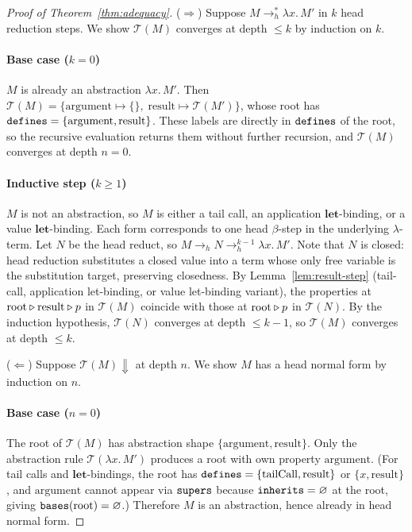 \begin{proof}[Proof of Theorem~\ref{thm:adequacy}]
  ($\Rightarrow$)
  Suppose $M \to^*_h \lambda x.\, M'$ in $k$ head reduction
  steps.
  We show $\mathcal{T}(M)$ converges at depth $\le k$ by
  induction on $k$.

  \paragraph{Base case ($k = 0$)}
  $M$ is already an abstraction
  $\lambda x.\, M'$.
  Then $\mathcal{T}(M) =
  \{\mathrm{argument} \mapsto \{\},\;
  \mathrm{result} \mapsto \mathcal{T}(M')\}$,
  whose root has
  $\mathtt{defines} = \{\mathrm{argument}, \mathrm{result}\}$.
  These labels are directly in $\mathtt{defines}$ of the root, so
  the recursive evaluation returns them without further
  recursion, and $\mathcal{T}(M)$ converges at depth $n = 0$.

  \paragraph{Inductive step ($k \ge 1$)}
  $M$ is not an abstraction,
  so $M$ is either a tail call, an application
  $\mathbf{let}$-binding, or a value
  $\mathbf{let}$-binding.
  Each form corresponds to one head $\beta$-step in the
  underlying $\lambda$-term.
  Let $N$ be the head reduct, so
  $M \to_h N \to^{k-1}_h \lambda x.\, M'$.
  Note that $N$ is closed: head reduction substitutes a
  closed value into a term whose only free variable is the
  substitution target, preserving closedness.
  By Lemma~\ref{lem:result-step} (tail-call,
    application let-binding, or value let-binding
  variant), the properties at
  $\text{root} \mathbin{\triangleright} \mathrm{result} \mathbin{\triangleright} p$
  in $\mathcal{T}(M)$ coincide with those at
  $\text{root} \mathbin{\triangleright} p$ in $\mathcal{T}(N)$.
  By the induction hypothesis, $\mathcal{T}(N)$
  converges at depth $\le k - 1$, so $\mathcal{T}(M)$
  converges at depth $\le k$.

  \medskip\noindent
  ($\Leftarrow$)
  Suppose $\mathcal{T}(M){\Downarrow}$ at depth $n$.
  We show $M$ has a head normal form by induction on $n$.

  \paragraph{Base case ($n = 0$)}
  The root of $\mathcal{T}(M)$ has
  abstraction shape
  $\{\mathrm{argument}, \mathrm{result}\}$.
  Only the abstraction rule $\mathcal{T}(\lambda x.\, M')$
  produces a root with own property $\mathrm{argument}$.
  (For tail calls and $\mathbf{let}$-bindings, the root has
    $\mathtt{defines} = \{\mathrm{tailCall}, \mathrm{result}\}$
    or $\{x, \mathrm{result}\}$, and $\mathrm{argument}$ cannot
    appear via $\mathtt{supers}$ because
    $\mathtt{inherits} = \varnothing$ at the root, giving
  $\mathtt{bases}(\text{root}) = \varnothing$.)
  Therefore $M$ is an abstraction, hence already in head normal
  form.


\end{proof}
